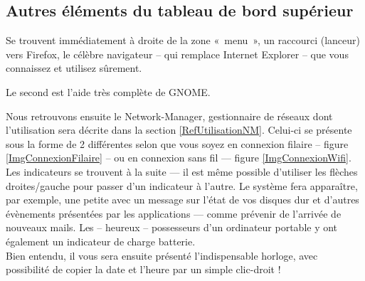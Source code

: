 \subsection{Autres éléments du tableau de bord supérieur}
\IconeBarreHaut
Se trouvent immédiatement à droite de la zone «~menu~», un raccourci (lanceur) vers Firefox, le célèbre navigateur  -- qui remplace Internet Explorer -- que vous connaissez et utilisez sûrement.\par
Le second est l'aide très complète de GNOME.\par
Nous retrouvons ensuite le Network-Manager, gestionnaire de réseaux dont l'utilisation sera décrite dans la section \ref{RefUtilisationNM}. Celui-ci se présente sous la forme de 2  différentes selon que vous soyez en connexion filaire -- figure \ref{ImgConnexionFilaire} -- ou en connexion sans fil --- figure \ref{ImgConnexionWifi}.\\
Les indicateurs se trouvent à la suite --- il est même possible d'utiliser les flèches droites/gauche pour passer d'un indicateur à l'autre. Le système fera apparaître, par exemple, une petite  avec un message sur l'état de vos disques dur et d'autres évènements présentées par les applications --- comme prévenir de l'arrivée de nouveaux mails. Les -- heureux -- possesseurs d'un ordinateur portable y ont également un indicateur de charge batterie.\\
Bien entendu, il vous sera ensuite présenté l'indispensable horloge, avec possibilité de copier la date et l'heure par un simple clic-droit !
